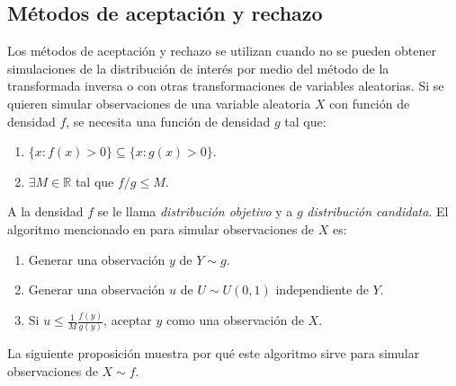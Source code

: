 \documentclass[11pt,a4paper]{article}
\begin{document}
\newpage

\subsection{Métodos de aceptación y rechazo}
\label{aceptacion}

Los métodos de aceptación y rechazo se utilizan cuando no se pueden obtener simulaciones de la distribución de interés por medio del método de la transformada inversa o con otras transformaciones de variables aleatorias. Si se quieren simular observaciones de una variable aleatoria $X$ con función de densidad $f$, se necesita una función de densidad $g$ tal que:
\begin{enumerate}
\item $\{x: f(x) > 0\}\subseteq \{x: g(x) > 0\}$.
\item $\exists M \in \mathbb{R}$ tal que $f/g \leq M.$
\end{enumerate}
A la densidad $f$ se le llama \textit{distribución objetivo} y a $g$ \textit{distribución candidata}. El algoritmo mencionado en \citet{casella} para simular observaciones de $X$ es:
\begin{enumerate}
\item Generar una observación $y$ de $Y\sim g$.
\item Generar una observación $u$ de $U\sim U(0,1)$ independiente de $Y$.
\item Si $u \leq \frac{1}{M}\frac{f(y)}{g(y)}$, aceptar $y$ como una observación de $X$.
\end{enumerate}

La siguiente proposición muestra por qué este algoritmo sirve para simular observaciones de $X \sim f$.
\end{document}
